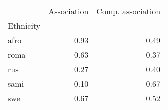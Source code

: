 \begin{tabular}{lrr}
\toprule
{} &  Association &  Comp. association \\
Ethnicity &              &                    \\
\midrule
afro      &         0.93 &               0.49 \\
roma      &         0.63 &               0.37 \\
rus       &         0.27 &               0.40 \\
sami      &        -0.10 &               0.67 \\
swe       &         0.67 &               0.52 \\
\bottomrule
\end{tabular}
